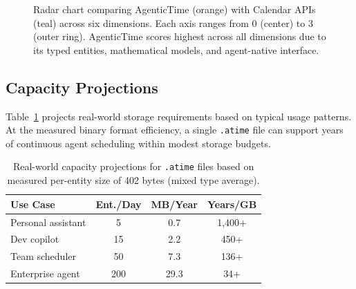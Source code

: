 \documentclass[10pt, twocolumn]{article}
\begin{document}
\begin{figure}[t]
\centering
{}
\caption{Radar chart comparing AgenticTime (orange) with Calendar APIs (teal) across six dimensions. Each axis ranges from 0 (center) to 3 (outer ring). AgenticTime scores highest across all dimensions due to its typed entities, mathematical models, and agent-native interface.}
\label{fig:radar}
\end{figure}


\subsection{Capacity Projections}

Table~\ref{tab:capacity} projects real-world storage requirements based on typical usage patterns. At the measured binary format efficiency, a single \texttt{.atime} file can support years of continuous agent scheduling within modest storage budgets.

\begin{table}[t]
\caption{Real-world capacity projections for \texttt{.atime} files based on measured per-entity size of 402 bytes (mixed type average).}
\label{tab:capacity}
\centering
\small
\begin{tabular}{@{}lccc@{}}
\toprule
\textbf{Use Case} & \textbf{Ent./Day} & \textbf{MB/Year} & \textbf{Years/GB} \\
\midrule
Personal assistant & 5 & 0.7 & 1{,}400+ \\
Dev copilot & 15 & 2.2 & 450+ \\
Team scheduler & 50 & 7.3 & 136+ \\
Enterprise agent & 200 & 29.3 & 34+ \\
\bottomrule
\end{tabular}
\end{table}
\end{document}
